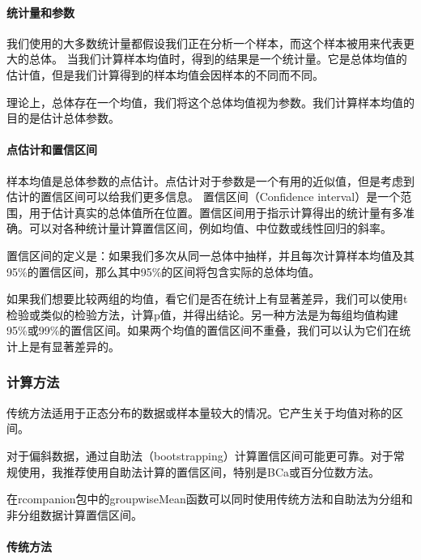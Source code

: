 \documentclass[]{book}
\let\oldparagraph\paragraph
\renewcommand{\paragraph}[1]{\oldparagraph{#1}\mbox{}}
\begin{document}
\hypertarget{ux7edfux8ba1ux91cfux548cux53c2ux6570}{%
\paragraph{统计量和参数}\label{ux7edfux8ba1ux91cfux548cux53c2ux6570}}

我们使用的大多数统计量都假设我们正在分析一个样本，而这个样本被用来代表更大的总体。
当我们计算样本均值时，得到的结果是一个统计量。它是总体均值的估计值，但是我们计算得到的样本均值会因样本的不同而不同。

理论上，总体存在一个均值，我们将这个总体均值视为参数。我们计算样本均值的目的是估计总体参数。

\hypertarget{ux70b9ux4f30ux8ba1ux548cux7f6eux4fe1ux533aux95f4}{%
\paragraph{点估计和置信区间}\label{ux70b9ux4f30ux8ba1ux548cux7f6eux4fe1ux533aux95f4}}

样本均值是总体参数的点估计。点估计对于参数是一个有用的近似值，但是考虑到估计的置信区间可以给我们更多信息。
置信区间（Confidence interval）是一个范围，用于估计真实的总体值所在位置。置信区间用于指示计算得出的统计量有多准确。可以对各种统计量计算置信区间，例如均值、中位数或线性回归的斜率。

置信区间的定义是：如果我们多次从同一总体中抽样，并且每次计算样本均值及其95\%的置信区间，那么其中95\%的区间将包含实际的总体均值。

如果我们想要比较两组的均值，看它们是否在统计上有显著差异，我们可以使用t检验或类似的检验方法，计算p值，并得出结论。另一种方法是为每组均值构建95\%或99\%的置信区间。如果两个均值的置信区间不重叠，我们可以认为它们在统计上是有显著差异的。

\hypertarget{ux8ba1ux7b97ux65b9ux6cd5}{%
\subsubsection{计算方法}\label{ux8ba1ux7b97ux65b9ux6cd5}}

传统方法适用于正态分布的数据或样本量较大的情况。它产生关于均值对称的区间。

对于偏斜数据，通过自助法（bootstrapping）计算置信区间可能更可靠。对于常规使用，我推荐使用自助法计算的置信区间，特别是BCa或百分位数方法。

在rcompanion包中的groupwiseMean函数可以同时使用传统方法和自助法为分组和非分组数据计算置信区间。

\hypertarget{ux4f20ux7edfux65b9ux6cd5}{%
\paragraph{传统方法}\label{ux4f20ux7edfux65b9ux6cd5}}
\end{document}
